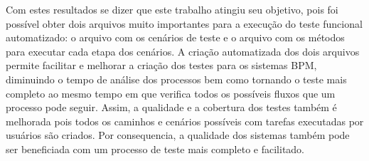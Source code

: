 \documentclass[12pt]{article}
\begin{document}
\begin{table}[]
\centering
\caption{Tabela obtida através do arquivo BPMN}
\label{tab:resultado}
\end{table}


Com estes resultados se dizer que este trabalho atingiu seu objetivo, pois foi possível obter dois arquivos muito importantes para a execução do teste funcional automatizado: o arquivo com os cenários de teste e o arquivo com os métodos para executar cada etapa dos cenários. A criação automatizada dos dois arquivos permite facilitar e melhorar a criação dos testes para os sistemas BPM, diminuindo o tempo de análise dos processos bem como tornando o teste mais completo ao mesmo tempo em que verifica todos os possíveis fluxos que um processo pode seguir. Assim, a qualidade e a cobertura dos testes também é melhorada pois todos os caminhos e cenários possíveis com tarefas executadas por usuários são criados. Por consequencia, a qualidade dos sistemas também pode ser beneficiada com um processo de teste mais completo e facilitado.
\end{document}
